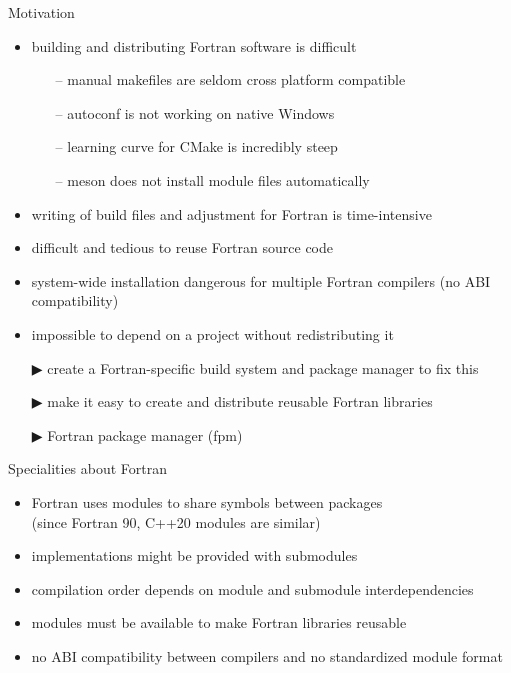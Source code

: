 \documentclass[lualatex,10pt,aspectratio=169]{beamer}
\begin{document}
\begin{frame}{Motivation}
   \begin{itemize}
      \item building and distributing Fortran software is difficult
         \begin{itemize}
            \item[--] manual makefiles are seldom cross platform compatible
            \item[--] autoconf is not working on native Windows
            \item[--] learning curve for CMake is incredibly steep
            \item[--] meson does not install module files automatically
         \end{itemize}
      \item writing of build files and adjustment for Fortran is time-intensive
      \item difficult and tedious to reuse Fortran source code
      \item system-wide installation dangerous for multiple Fortran compilers
         (no ABI compatibility)
      \item impossible to depend on a project without redistributing it
         \\[2ex]
      \item[\alert{▶}] create a \alert{Fortran-specific} build system and package manager to fix this
      \item[\alert{▶}] make it easy to create and distribute \alert{reusable} Fortran libraries
      \item[\alert{▶}] Fortran package manager (\alert{fpm})
   \end{itemize}
\end{frame}

\begin{frame}{Specialities about Fortran}
   \begin{itemize}
      \item Fortran uses modules to share symbols between packages\\(since Fortran 90, C++20 modules are similar)
      \item implementations might be provided with submodules
      \item compilation order depends on module and submodule interdependencies
      \item modules must be available to make Fortran libraries reusable
      \item no ABI compatibility between compilers and no standardized module format
   \end{itemize}
\end{frame}
\end{document}
